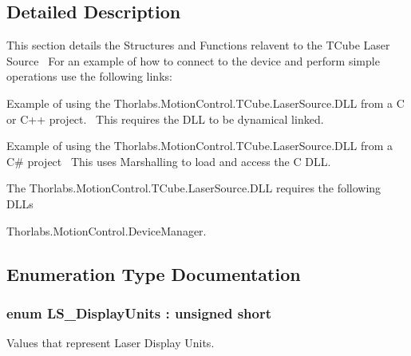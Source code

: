 \subsection{Detailed Description}
This section details the Structures and Functions relavent to the T\+Cube Laser Source~\newline
 For an example of how to connect to the device and perform simple operations use the following links\+: 
\begin{DoxyItemize}
\item Example of using the Thorlabs.Motion\+Control.T\+Cube.Laser\+Source.D\+LL from a C or C++ project.~\newline
 This requires the D\+LL to be dynamical linked.  
\item Example of using the Thorlabs.Motion\+Control.T\+Cube.Laser\+Source.D\+LL from a C\# project~\newline
 This uses Marshalling to load and access the C D\+LL.  
\end{DoxyItemize}The Thorlabs.\+Motion\+Control.\+T\+Cube.\+Laser\+Source.\+D\+LL requires the following D\+L\+Ls 
\begin{DoxyItemize}
\item Thorlabs.\+Motion\+Control.\+Device\+Manager.  
\end{DoxyItemize}

\subsection{Enumeration Type Documentation}
\subsubsection[{\texorpdfstring{L\+S\+\_\+\+Display\+Units}{LS_DisplayUnits}}]{\setlength{\rightskip}{0pt plus 5cm}enum {\bf L\+S\+\_\+\+Display\+Units} \+: unsigned short}\hypertarget{group___t_cube_laser_source_ga4984a8836d4912e01e360688c22ce0ef}{}\label{group___t_cube_laser_source_ga4984a8836d4912e01e360688c22ce0ef}


Values that represent Laser Display Units. 

